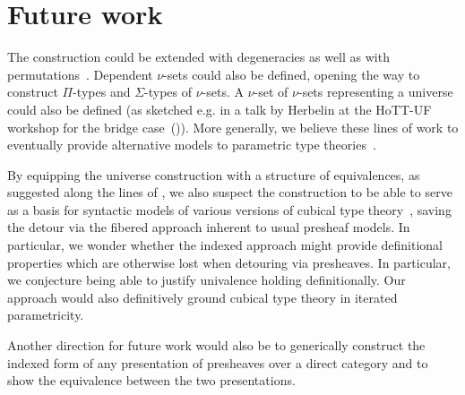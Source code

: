 \documentclass{msc}
\begin{document}
\section{Future work}
The construction could be extended with degeneracies as well as with permutations~\citep{grandis03}. Dependent $\nu$-sets could also be defined, opening the way to construct $\Pi$-types and $\Sigma$-types of $\nu$-sets. A $\nu$-set of $\nu$-sets representing a universe could also be defined (as sketched e.g. in a talk by Herbelin at the HoTT-UF workshop for the bridge case~(\citeyear{herbelin-hott-uf})). More generally, we believe these lines of work to eventually provide alternative models to parametric type theories~\citep{nuyts17,cavallo19}.

By equipping the universe construction with a structure of equivalences, as suggested along the lines of \cite{altenkirch15}, we also suspect the construction to be able to serve as a basis for syntactic models of various versions of cubical type theory~\citep{bezem13,cohen16,angiuli21}, saving the detour via the fibered approach inherent to usual presheaf models. In particular, we wonder whether the indexed approach might provide definitional properties which are otherwise lost when detouring via presheaves. In particular, we conjecture being able to justify univalence holding definitionally. Our approach would also definitively ground cubical type theory in iterated parametricity.

Another direction for future work would also be to generically construct the indexed form of any presentation of presheaves over a direct category and to show the equivalence between the two presentations.

\newpage


\end{document}
